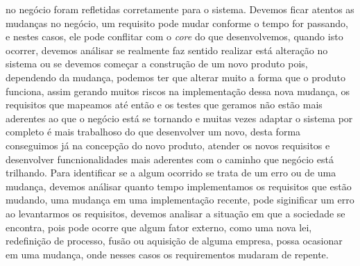     no negócio foram refletidas corretamente para o sistema. \newline
    Devemos ficar atentos as mudanças no negócio, um requisito pode mudar conforme
    o tempo for passando, e nestes casos, ele pode conflitar com o \textit{core}
    do que desenvolvemos, quando isto ocorrer, devemos análisar se realmente faz
    sentido realizar está alteração no sistema ou se devemos começar a construção
    de um novo produto pois, dependendo da mudança, podemos ter que alterar muito
    a forma que o produto funciona, assim gerando muitos riscos na implementação
    dessa nova mudança, os requisitos que mapeamos até então e os testes que
    geramos não estão mais aderentes ao que o negócio está se tornando e muitas
    vezes adaptar o sistema por completo é mais trabalhoso do que desenvolver um
    novo, desta forma conseguimos já na concepção do novo produto, atender os
    novos requisitos e desenvolver funcnionalidades mais aderentes com o caminho
    que negócio está trilhando. Para identificar se a algum ocorrido se trata de
    um erro ou de uma mudança, devemos análisar quanto tempo implementamos os
    requisitos que estão mudando, uma mudança em uma implementação recente, pode
    siginificar um erro ao levantarmos os requisitos, devemos analisar a situação
    em que a sociedade se encontra, pois pode ocorre que algum fator externo, como
    uma nova lei, redefinição de processo, fusão ou aquisição de alguma empresa,
    possa ocasionar em uma mudança, onde nesses casos os requirementos mudaram
    de repente.
